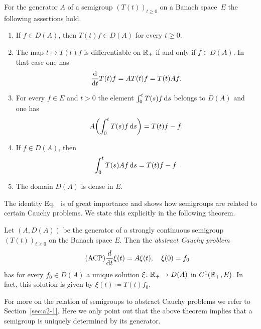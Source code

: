 \begin{proposition}\label{prop:a1-1.6}
For the generator $A$ of a semigroup $(T(t))_{t \geq 0}$ on a Banach space~$E$ the following assertions hold.
\begin{enumerate}[\upshape(i)]
\item
If\/ $f \in D(A)$, then $T(t)f \in D(A)$ for every $t \geq 0$.

\item
The map $t \mapsto T(t)f$ is differentiable on $\mathbb{R}_{+}$ if and only if\/ $f \in D(A)$.
In that case one has
\begin{equation}\label{eq:a1-1.2}
    \frac{\mathop{}\!\mathrm{d}{}}{\mathop{}\!\mathrm{d}{t}} T(t)f = AT(t)f = T(t)Af .
\end{equation}
\item
For every $f \in E$ and $t > 0$ the element $\int_0^t T(s)f \mathop{}\!\mathrm{d}{s}$ belongs to $D(A)$ and one has
\begin{equation}\label{eq:a1-1.3}
    A \mleft( \int_0^t T(s)f \ds \mright) = T(t)f - f  .
\end{equation}
\item
If\/ $f \in D(A)$, then
\begin{equation}\label{eq:a1-1.4}
    \int_0^t T(s)Af \mathop{}\!\mathrm{d}{s} = T(t)f - f  .
\end{equation}
\item
The domain $D(A)$ is dense in $E$.
\end{enumerate}
\end{proposition}
The identity Eq.~ is of great importance and shows how semigroups are related to certain Cauchy problems.
We state this explicitly in the following theorem.
\begin{theorem}\label{thm:a1-1.7}
Let $(A,D(A))$ be the generator of a strongly continuous semigroup $(T(t))_{t \geq 0}$ on the Banach space $E$.
Then the \emph{abstract Cauchy problem}
\begin{equation}\label{eq:a1-1.5.ACP} \tag{ACP}
\frac{d}{\mathop{}\!\mathrm{d}{t}}\xi(t) = A\xi(t), \quad \xi(0) = f_{0}
\end{equation}
has for every $f_{0} \in D(A)$ a unique solution $\xi \colon \mathbb{R}_{+} \to D(A)$ in $C^1(\mathbb{R}_{+},E)$.
In fact, this solution is given by $\xi(t) \coloneq T(t)f_{0}$.
\end{theorem}
For more on the relation of semigroups to abstract Cauchy problems we refer to Section~\ref{sec:a2-1}.
Here we only point out that the above theorem implies that a semigroup is uniquely determined by its generator.

